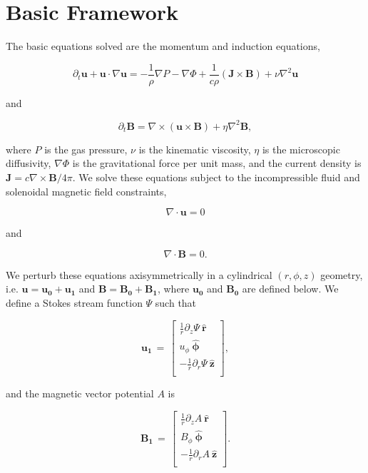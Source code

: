 \documentclass{emulateapj}
\newcommand{\beq}{\begin{equation}}
\newcommand{\eeq}{\end{equation}}
\newcommand{\uphi}{\ensuremath{u_\phi}}
\newcommand{\rhat}{\ensuremath{\mathbf{\hat{r}}}}
\newcommand{\phihat}{\ensuremath{\mathbf{\hat{\phi}}}}
\newcommand{\zhat}{\ensuremath{\mathbf{\hat{z}}}}
\begin{document}
\section{Basic Framework}
\label{sec:wide_gap}
The basic equations solved are the momentum and induction equations,

\beq\label{momentum}
\partial_t \mathbf{u} + \mathbf{u} \cdot \nabla \mathbf{u} = -\frac{1}{\rho}\nabla P - \nabla\Phi + \frac{1}{c\rho} \left(\mathbf{J}\times\mathbf{B}\right) + \nu\nabla^2 \mathbf{u} 
\eeq

and

\beq\label{induction}
\partial_t \mathbf{B} = \nabla \times \left(\mathbf{u} \times \mathbf{B}\right) + \eta\nabla^2\mathbf{B},
\eeq

where $P$ is the gas pressure, $\nu$ is the kinematic viscosity, $\eta$ is the microscopic diffusivity, $\nabla\Phi$ is the gravitational force per unit mass, and the current density is $\mathbf{J} = c \nabla\times\mathbf{B}/4\pi$. We solve these equations subject to the incompressible fluid and solenoidal magnetic field constraints,

\beq
\label{eq:incompressibility}
\nabla \cdot \mathbf{u} = 0
\eeq

and 

\beq
\label{eq:solenoid}
\nabla \cdot \mathbf{B} = 0.
\eeq

We perturb these equations axisymmetrically in a cylindrical $(r, \phi, z)$ geometry, i.e. $\mathbf{u} = \mathbf{u_0} + \mathbf{u_1}$ and $\mathbf{B} = \mathbf{B_0} + \mathbf{B_1}$, where $\mathbf{u_0}$ and $\mathbf{B_0}$ are defined below. We define a Stokes stream function $\Psi$ such that 

\beq
  \label{eq:stokes}
  \mathbf{u_1} \, = \, \left[\begin{matrix}
\frac{1}{r} \partial_z \Psi\ \rhat\\
\uphi \ \phihat\\
-\frac{1}{r} \partial_r \Psi\ \zhat\\
\end{matrix}\right],
\eeq

and the magnetic vector potential $A$ is

\beq
  \label{eq:fluxfunc}
  \mathbf{B_1} \, = \, \left[\begin{matrix}
\frac{1}{r} \partial_z A\ \rhat\\
B_{\phi} \ \phihat\\
-\frac{1}{r} \partial_r A\ \zhat\\
\end{matrix}\right].
\eeq
\end{document}
